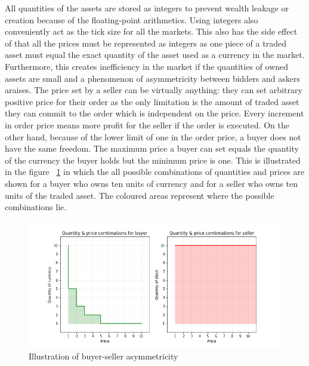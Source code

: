 All quantities of the assets are stored as integers to prevent wealth leakage 
or creation because of the floating-point arithmetics. Using integers also
conveniently act as the tick size for all the markets. This also has the side effect
of that all the prices must be represented as integers as one piece
of a traded asset must equal the exact quantity of the asset used as a currency
in the market. Furthermore, this creates inefficiency in the market if the quantities
of owned assets are small and a phenomenon of asymmetricity between bidders and askers
araises. The price set by a seller can be virtually anything: they can set
arbitrary positive price for their order as the only limitation is the amount
of traded asset they can commit to the order which is independent on the price. 
Every increment in order price means more profit for the seller
if the order is executed. On the other hand, because of the 
lower limit of one in the order price, a buyer does not have the same freedom.
The maximum price a buyer can set equals the quantity of the currency 
the buyer holds but the minimum price is one. This is
illustrated in the figure ~\ref{fig:buy_sell_asym} in which the all possible
combinations of quantities and prices are shown for a buyer who owns ten units 
of currency and for a seller who owns ten units of the traded asset. 
The coloured areas represent where the possible combinations lie. 


 \begin{figure}[H]
    \includegraphics[width=\linewidth]{plots/buyer_seller_asymmetricity.png}
    \caption{Illustration of buyer-seller asymmetricity}
    \label{fig:buy_sell_asym}
\end{figure}

